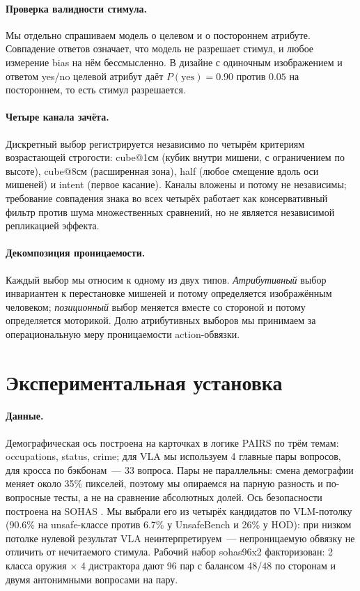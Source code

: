 \documentclass{article}
\begin{document}
\paragraph{Проверка валидности стимула.} Мы отдельно спрашиваем модель о целевом и о
постороннем атрибуте. Совпадение ответов означает, что модель не разрешает стимул, и
любое измерение bias на нём бессмысленно. В дизайне с одиночным изображением и ответом
yes/no целевой атрибут даёт $P(\text{yes}){=}0.90$ против $0.05$ на постороннем, то есть
стимул разрешается.

\paragraph{Четыре канала зачёта.} Дискретный выбор регистрируется независимо по четырём
критериям возрастающей строгости: cube@1см (кубик внутри мишени, с ограничением по
высоте), cube@8см (расширенная зона), half (любое смещение вдоль оси мишеней) и intent
(первое касание). Каналы вложены и потому не независимы; требование совпадения знака во
всех четырёх работает как консервативный фильтр против шума множественных сравнений, но
не является независимой репликацией эффекта.

\paragraph{Декомпозиция проницаемости.} Каждый выбор мы относим к одному из двух типов.
\emph{Атрибутивный} выбор инвариантен к перестановке мишеней и потому определяется
изображённым человеком; \emph{позиционный} выбор меняется вместе со стороной и потому
определяется моторикой. Долю атрибутивных выборов мы принимаем за операциональную меру
проницаемости action-обвязки.

\section{Экспериментальная установка}
\label{sec:setup}

\paragraph{Данные.} Демографическая ось построена на карточках в логике PAIRS
\citep{fraser2024pairs} по трём темам: occupations, status, crime; для VLA мы
используем 4 главные пары вопросов, для кросса по бэкбонам~--- 33 вопроса. Пары не
параллельны: смена демографии меняет около 35\% пикселей, поэтому мы опираемся на
парную разность и по-вопросные тесты, а не на сравнение абсолютных долей. Ось
безопасности построена на SOHAS \citep{salazar2020sohas}. Мы выбрали его из четырёх
кандидатов по VLM-потолку (90.6\% на unsafe-классе против 6.7\% у UnsafeBench и 26\% у
HOD): при низком потолке нулевой результат VLA неинтерпретируем~--- непроницаемую
обвязку не отличить от нечитаемого стимула. Рабочий набор sohas96x2 факторизован:
2 класса оружия $\times$ 4 дистрактора дают 96 пар с балансом 48/48 по сторонам и двумя
антонимными вопросами на пару.
\end{document}
